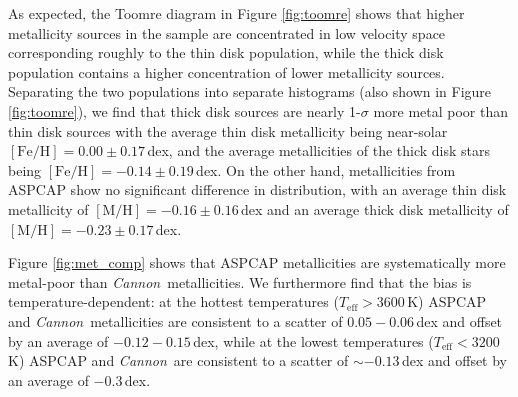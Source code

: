 \documentclass[twocolumn]{aastex62}
\newcommand{\cannon}{\textsl{Cannon}}
\newcommand{\teff}{T_{\mathrm{eff}}}
\newcommand{\feh}{[{\mathrm{Fe}/\mathrm{H}}]}
\newcommand{\mh}{[{\mathrm{M}/\mathrm{H}}]}
\begin{document}
As expected, the Toomre diagram in Figure \ref{fig:toomre} shows that higher metallicity sources in the sample are concentrated in low velocity space corresponding roughly to the thin disk population, while the thick disk population contains a higher concentration of lower metallicity sources. Separating the two populations into separate histograms (also shown in Figure \ref{fig:toomre}), we find that thick disk sources are nearly 1-$\sigma$ more metal poor than thin disk sources with the average thin disk metallicity being near-solar $\feh=0.00\pm0.17\,$dex, and the average metallicities of the thick disk stars being $\feh=-0.14\pm0.19\,$dex.
On the other hand, metallicities from ASPCAP show no significant difference in distribution, with an average thin disk metallicity of $\mh=-0.16\pm0.16\,$dex and an average thick disk metallicity of $\mh=-0.23\pm0.17\,$dex.

Figure \ref{fig:met_comp} shows that ASPCAP metallicities are systematically more metal-poor than \cannon\ metallicities. We furthermore find that the bias is temperature-dependent: at the hottest temperatures ($\teff>3600\,$K) ASPCAP and \cannon\ metallicities are consistent to a scatter of $0.05-0.06\,$dex and offset by an average of $-0.12-0.15\,$dex, while at the lowest temperatures ($\teff<3200\,$K) ASPCAP and \cannon\ are consistent to a scatter of $\sim-0.13\,$dex and offset by an average of $-0.3\,$dex.


\end{document}
